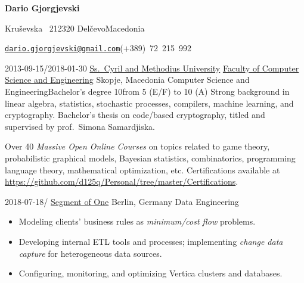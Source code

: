 \documentclass[version=last, paper=A4, DIV=12, toc=bibliography]{scrartcl}%
\begin{document}
\begin{addmargin}{.2\textwidth}
  \begin{center}
    \LARGE\bfseries Dario Gjorgjevski
  \end{center}
  \begin{flushleft}
    \begin{description}[noitemsep, leftmargin=*]
    \item[\faHome] Kruševska \textnumero~21\hfill\textbullet\hfill 2320
      Delčevo\hfill\textbullet\hfill Macedonia
    \item[\faAddressCard] \href{mailto:dario.gjorgjevski@gmail.com}%
      {\nolinkurl{dario.gjorgjevski@gmail.com}}\hfill (+389)~72~215~992
    \end{description}
  \end{flushleft}
\end{addmargin}

\label{sec:education}

\EducationEntry%
{2013-09-15/2018-01-30}%
{\href{http://ukim.edu.mk/}{Ss.\ Cyril and Methodius University}}%
{\href{https://finki.ukim.mk/}{Faculty of Computer Science and Engineering}}%
{Skopje, Macedonia}%
{Computer Science and Engineering}{Bachelor's degree}%
{10}{from 5 (E/F) to 10 (A)}%
{%
  Strong background in linear algebra, statistics, stochastic processes,
  compilers, machine learning, and cryptography.  Bachelor's thesis on
  code\-/based cryptography, titled  and supervised by prof.\
  Simona Samardjiska.%
}

\begin{tcolorbox}[size=fbox, fontupper=\small, fontlower=\footnotesize]
  Over \num{40} \emph{Massive Open Online Courses} on topics related to game
  theory, probabilistic graphical models, Bayesian statistics, combinatorics,
  programming language theory, mathematical optimization, etc.%
  \tcblower%
  Certifications available at
  \url{https://github.com/d125q/Personal/tree/master/Certifications}.
\end{tcolorbox}

\label{sec:experience}

\WorkEntry%
{2018-07-18/}%
{\href{https://www.so1.ai/en/}{Segment of One}}%
{Berlin, Germany}%
{Data Engineering}%
{%
  \begin{itemize}[noitemsep, leftmargin=*]
  \item Modeling clients' business rules as \emph{minimum\-/cost flow} problems.
  \item Developing internal ETL tools and processes; implementing
    \emph{change data capture} for heterogeneous data sources.
  \item Configuring, monitoring, and optimizing Vertica clusters and databases.
  \end{itemize}
}
\end{document}
